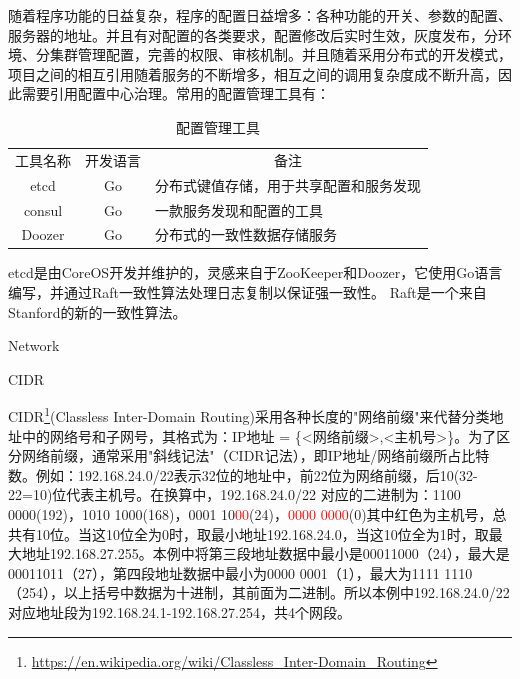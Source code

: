 \documentclass[8pt]{book}
\makeatletter
\numberwithin{dummy}{section}
\theoremstyle{ocrenumbox}
\theoremstyle{blacknumex}
\theoremstyle{blacknumbox}
\theoremstyle{ocrenum}
\renewcommand{\section}{\@startsection{section}{1}{\z@}
	{-4ex \@plus -1ex \@minus -.4ex}
	{1ex \@plus.2ex }
	{\normalfont\large\sffamily\bfseries}}
\renewcommand{\subsection}{\@startsection {subsection}{2}{\z@}
	{-3ex \@plus -0.1ex \@minus -.4ex}
	{0.5ex \@plus.2ex }
	{\normalfont\sffamily\bfseries}}
\makeatother
\begin{document}
随着程序功能的日益复杂，程序的配置日益增多：各种功能的开关、参数的配置、服务器的地址。并且有对配置的各类要求，配置修改后实时生效，灰度发布，分环境、分集群管理配置，完善的权限、审核机制。并且随着采用分布式的开发模式，项目之间的相互引用随着服务的不断增多，相互之间的调用复杂度成不断升高，因此需要引用配置中心治理。常用的配置管理工具有：

\begin{table}[htbp]
	\caption{配置管理工具}
	\label{table:configmanagementtool}
	\begin{center}
		\begin{tabular}{|c|c|p{8cm}|}
			\hline
			\multirow{1}{*}{工具名称}
			& \multicolumn{1}{c|}{开发语言} 
			& \multicolumn{1}{c|}{备注}\\			
			\cline{1-3}
			etcd &  Go  & 分布式键值存储，用于共享配置和服务发现 \\
			\hline
			consul & Go &  一款服务发现和配置的工具 \\
			\hline
			Doozer & Go & 分布式的一致性数据存储服务 \\
			\hline							
		\end{tabular}	
	\end{center}
\end{table}

etcd是由CoreOS开发并维护的，灵感来自于ZooKeeper和Doozer，它使用Go语言编写，并通过Raft一致性算法处理日志复制以保证强一致性。 Raft是一个来自Stanford的新的一致性算法。



\section{Network}

\subsection{CIDR}

CIDR\footnote{\url{https://en.wikipedia.org/wiki/Classless_Inter-Domain_Routing}}(Classless Inter-Domain Routing)采用各种长度的"网络前缀"来代替分类地址中的网络号和子网号，其格式为：IP地址 = \{<网络前缀>,<主机号>\}。为了区分网络前缀，通常采用"斜线记法"（CIDR记法），即IP地址/网络前缀所占比特数。例如：192.168.24.0/22表示32位的地址中，前22位为网络前缀，后10(32-22=10)位代表主机号。在换算中，192.168.24.0/22 对应的二进制为：1100 0000(192)，1010 1000(168)，0001 10\textcolor{red}{00}(24)，\textcolor{red}{0000 0000}(0)其中红色为主机号，总共有10位。当这10位全为0时，取最小地址192.168.24.0，当这10位全为1时，取最大地址192.168.27.255。本例中将第三段地址数据中最小是00011000（24），最大是00011011（27），第四段地址数据中最小为0000 0001（1），最大为1111 1110（254），以上括号中数据为十进制，其前面为二进制。所以本例中192.168.24.0/22 对应地址段为192.168.24.1-192.168.27.254，共4个网段。
\end{document}
